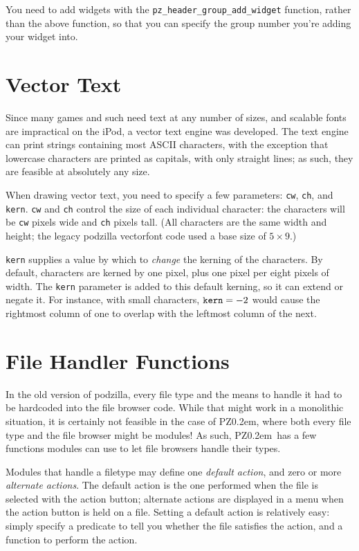 \documentclass[12pt,letterpaper]{report}
\def\pz{{\footnotesize PZ}}
\def\pzt{\pz\kern0.2em{\large\oldstyle2}}
\begin{document}
You need to add widgets with the \verb|pz_header_group_add_widget|
function, rather than the above function, so that you can specify
the group number you're adding your widget into.

\section{Vector Text}
Since many games and such need text at any number of sizes, and scalable fonts are impractical
on the iPod, a vector text engine was developed. The text engine can print strings containing
most ASCII characters, with the exception that lowercase characters are printed as capitals,
with only straight lines; as such, they are feasible at absolutely any size.

When drawing vector text, you need to specify a few parameters: \verb|cw|, \verb|ch|, and
\verb|kern|. \verb|cw| and \verb|ch| control the size of each individual character:
the characters will be \verb|cw| pixels wide and \verb|ch| pixels tall. (All characters
are the same width and height; the legacy podzilla vectorfont code used a base size of
$5\times9$.)

\verb|kern| supplies a value by which to {\it change} the kerning of the characters.
By default, characters are kerned by one pixel, plus one pixel per eight pixels of width.
The \verb|kern| parameter is added to this default kerning, so it can extend or negate it.
For instance, with small characters, $\verb|kern| = -2$ would cause the rightmost column
of one to overlap with the leftmost column of the next.

\section{File Handler Functions}
In the old version of podzilla, every file type and the means to handle it had to be hardcoded
into the file browser code. While that might work in a monolithic situation, it is certainly
not feasible in the case of \pzt, where both every file type and the file browser might be
modules! As such, \pzt\ has a few functions modules can use to let file browsers handle
their types.

Modules that handle a filetype may define one {\sl default action}, and zero or more {\sl
alternate actions}. The default action is the one performed when the file is selected
with the action button; alternate actions are displayed in a menu when the action button
is held on a file. Setting a default action is relatively easy: simply specify a predicate
to tell you whether the file satisfies the action, and a function to perform the action.
\end{document}
